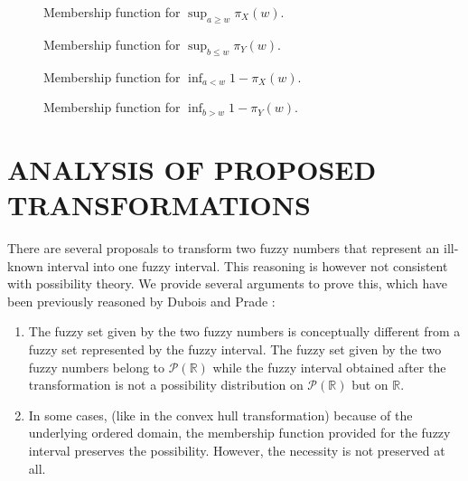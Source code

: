 \documentclass[twoside,twocolumn,a4paper]{article}
\newcommand{\Pow}{\mathcal{P}}
\begin{document}
\begin{figure}[h!]
\centering

\caption{Membership function for $\sup_{a\geq w}\pi_{X}(w)$.}
\label{fig:interval_membership_pos_a}
\end{figure}

\begin{figure}[h!]
\centering

\caption{Membership function for $\sup_{b\leq w}\pi_{Y}(w)$.}
\label{fig:interval_membership_pos_b}
\end{figure}

\begin{figure}[h!]
\centering

\caption{Membership function for $\inf_{a<w}1-\pi_{X}(w)$.}
\label{fig:interval_membership_nec_a}
\end{figure}

\begin{figure}[h!]
\centering

\caption{Membership function for $\inf_{b>w}1-\pi_{Y}(w)$.}
\label{fig:interval_membership_nec_b}
\end{figure}

\section{\label{sec:analysis}ANALYSIS OF PROPOSED TRANSFORMATIONS}

There are several proposals to transform two fuzzy numbers that represent an ill-known interval into one fuzzy interval. This reasoning is however not consistent with possibility theory. We provide several arguments to prove this, which have been previously reasoned by Dubois and Prade \cite{Dubois88b}:

\begin{enumerate}
\item
The fuzzy set given by the two fuzzy numbers is conceptually different from a fuzzy set represented by the fuzzy interval. The fuzzy set given by the two fuzzy numbers belong to $\Pow(\mathbb{R})$ while the fuzzy interval obtained after the transformation is not a possibility distribution on $\Pow(\mathbb{R})$  but on $\mathbb{R}$.
\item
In some cases, (like in the convex hull transformation) because of the underlying ordered domain, the membership function provided for the fuzzy interval preserves the possibility. However, the necessity is not preserved at all.
\end{enumerate}
\end{document}
